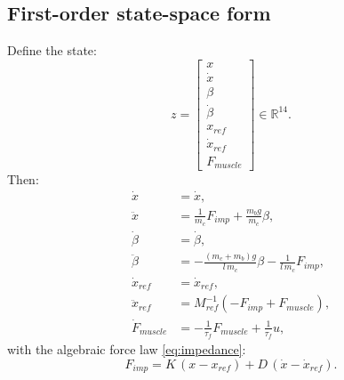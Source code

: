 \documentclass[11pt,a4paper]{article}
\begin{document}
\subsection*{First-order state-space form}
Define the state:
\[
z =
\begin{bmatrix}
x\\ \dot{x}\\ \beta\\ \dot{\beta}\\ x_{ref}\\ \dot{x}_{ref}\\ F_{muscle}
\end{bmatrix}
\in\mathbb{R}^{14}.
\]
Then:
\begin{align}
\dot{x} &= \dot{x}, \label{eq:ss1}\\
\ddot{x} &= \frac{1}{m_c}F_{imp} + \frac{m_b g}{m_c}\beta, \label{eq:ss2}\\
\dot{\beta} &= \dot{\beta}, \label{eq:ss3}\\
\ddot{\beta} &=
-\frac{(m_c+m_b)g}{l\,m_c}\beta
-\frac{1}{l\,m_c}F_{imp}, \label{eq:ss4}\\
\dot{x}_{ref} &= \dot{x}_{ref}, \label{eq:ss5}\\
\ddot{x}_{ref} &= M_{ref}^{-1}\left(-F_{imp} + F_{muscle}\right), \label{eq:ss6}\\
\dot{F}_{muscle} &= -\frac{1}{\tau_f}F_{muscle} + \frac{1}{\tau_f}u, \label{eq:ss7}
\end{align}
with the algebraic force law \eqref{eq:impedance}:
\[
F_{imp} = K\,(x-x_{ref}) + D\,(\dot{x}-\dot{x}_{ref}).
\]
\end{document}
